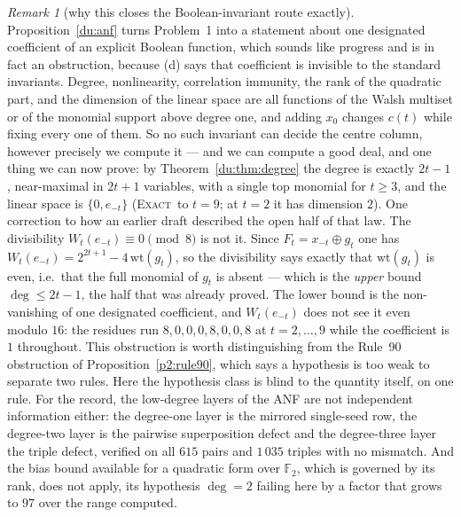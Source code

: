 \documentclass[11pt]{article}
\theoremstyle{definition}
\theoremstyle{remark}
\newtheorem{remark}[theorem]{Remark}
\newcommand{\F}{\mathbb{F}_2}
\newcommand{\EXACT}{\textsc{Exact}}
\begin{document}
\begin{remark}[why this closes the Boolean-invariant route exactly]\label{du:anfobstruction}
Proposition~\ref{du:anf} turns Problem~1 into a statement about one designated coefficient of an
explicit Boolean function, which sounds like progress and is in fact an obstruction, because (d) says
that coefficient is invisible to the standard invariants. Degree, nonlinearity, correlation immunity,
the rank of the quadratic part, and the dimension of the linear space are all functions of the Walsh
multiset or of the monomial support above degree one, and adding $x_0$ changes $c(t)$ while fixing every
one of them. So no such invariant can decide the centre column, however precisely we compute it --- and
we can compute a good deal, and one thing we can now prove: by Theorem~\ref{du:thm:degree} the degree
is exactly $2t-1$, near-maximal in $2t+1$ variables, with a single top monomial for $t\ge3$, and the
linear space is $\{0,e_{-t}\}$ (\EXACT\ to $t=9$; at $t=2$ it has dimension $2$). One correction to how an earlier draft described the open half of that
law. The divisibility $W_t(e_{-t})\equiv0\pmod 8$ is not it. Since $F_t=x_{-t}\oplus g_t$ one has
$W_t(e_{-t})=2^{2t+1}-4\,\mathrm{wt}(g_t)$, so the divisibility says exactly that $\mathrm{wt}(g_t)$ is
even, i.e.\ that the full monomial of $g_t$ is absent --- which is the \emph{upper} bound
$\deg\le2t-1$, the half that was already proved. The lower bound is the non-vanishing of one designated
coefficient, and $W_t(e_{-t})$ does not see it even modulo $16$: the residues run $8,0,0,0,8,0,0,8$ at
$t=2,\dots,9$ while the coefficient is $1$ throughout. This obstruction is worth distinguishing
from the Rule~90 obstruction of Proposition~\ref{p2:rule90}, which says a hypothesis is too weak to
separate two rules. Here the hypothesis class is blind to the quantity itself, on one rule. For the
record, the low-degree layers of the ANF are not independent information either: the degree-one layer
is the mirrored single-seed row, the degree-two layer is the pairwise superposition defect and the
degree-three layer the triple defect, verified on all $615$ pairs and $1\,035$ triples with no
mismatch. And the bias bound available for a quadratic form over $\F$, which is governed by its rank,
does not apply, its hypothesis $\deg=2$ failing here by a factor that grows to $97$ over the range
computed.
\end{remark}
\end{document}

